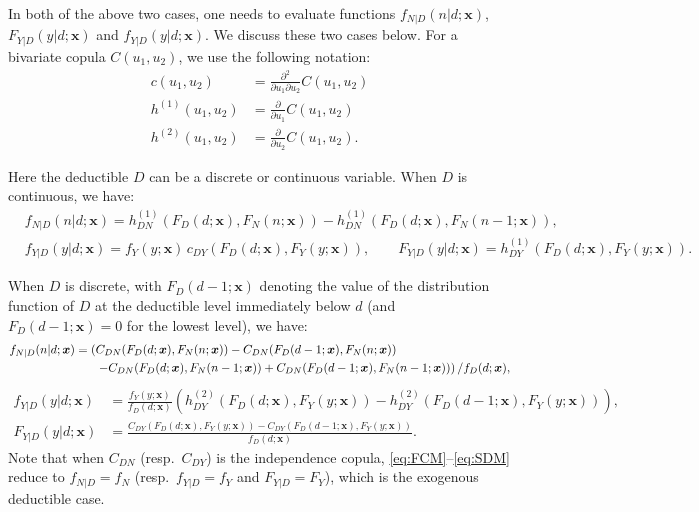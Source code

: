 \documentclass[11pt]{article}
\newcommand{\rev}[1]{{\color{blue}#1}}
\begin{document}
In both of the above two cases, one needs to evaluate functions \rev{$f_{N|D}(n|d;\bm{x})$, $F_{Y|D}(y|d;\bm{x})$ and $f_{Y|D}(y|d;\bm{x})$}. We discuss these two cases below. For a bivariate copula $C(u_1,u_2)$, we use the following notation:
\begin{align*}
	c(u_1,u_2)& = \frac{\partial^2}{\partial u_1\partial u_2} C(u_1,u_2) \\
	h^{(1)}(u_1,u_2)& = \frac{\partial}{\partial u_1} C(u_1,u_2) \\
	h^{(2)}(u_1,u_2)& = \frac{\partial}{\partial u_2} C(u_1,u_2).
\end{align*}

Here the deductible $D$ can be a discrete or continuous variable. When $D$ is continuous, we have:
{\color{blue}
\begin{align} \label{eq:FCM}
	&f_{N|D}(n|d;\bm{x}) = h^{(1)}_{DN}(F_D(d;\bm{x}),F_{N}(n;\bm{x})) - h^{(1)}_{DN}(F_D(d;\bm{x}),F_{N}(n-1;\bm{x})),\\
	\label{eq:SCM} &f_{Y|D}(y|d;\bm{x}) =  f_{Y}(y;\bm{x})\, c_{DY}(F_D(d;\bm{x}),F_{Y}(y;\bm{x})), \qquad F_{Y|D}(y|d;\bm{x}) = h^{(1)}_{DY}(F_D(d;\bm{x}),F_{Y}(y;\bm{x})).
\end{align}
}

When $D$ is discrete, \rev{with $F_D(d-1;\bm{x})$ denoting the value of the distribution function of $D$ at the deductible level immediately below $d$ (and $F_D(d-1;\bm{x})=0$ for the lowest level)}, we have:
{\color{blue}
\begin{equation} \label{eq:FDM}
\begin{aligned}
	f_{N|D}(n|d;\bm{x}) & = \left(C_{DN}(F_D(d;\bm{x}),F_{N}(n;\bm{x})) - C_{DN}(F_D(d-1;\bm{x}),F_{N}(n;\bm{x}))\right. \\
	& \hspace{0.6cm}\left.-C_{DN}(F_D(d;\bm{x}),F_{N}(n-1;\bm{x})) + C_{DN}(F_D(d-1;\bm{x}),F_{N}(n-1;\bm{x}))\right)/f_D(d;\bm{x}),
\end{aligned}
\end{equation}
\vspace{-13pt}
\begin{equation} \label{eq:SDM}
\begin{aligned}
	f_{Y|D}(y|d;\bm{x}) &= \frac{f_{Y}(y;\bm{x})}{f_{D}(d;\bm{x})}\left(h^{(2)}_{DY}(F_D(d;\bm{x}),F_{Y}(y;\bm{x})) - h^{(2)}_{DY}(F_D(d-1;\bm{x}),F_{Y}(y;\bm{x}))\right),\\
	F_{Y|D}(y|d;\bm{x}) &= \frac{C_{DY}(F_D(d;\bm{x}),F_{Y}(y;\bm{x})) - C_{DY}(F_D(d-1;\bm{x}),F_{Y}(y;\bm{x}))}{f_{D}(d;\bm{x})}.
\end{aligned}
\end{equation}
}
\rev{Note that when $C_{DN}$ (resp.\ $C_{DY}$) is the independence copula, \eqref{eq:FCM}--\eqref{eq:SDM} reduce to $f_{N|D}=f_{N}$ (resp.\ $f_{Y|D}=f_{Y}$ and $F_{Y|D}=F_{Y}$), which is the exogenous deductible case.}
\end{document}
